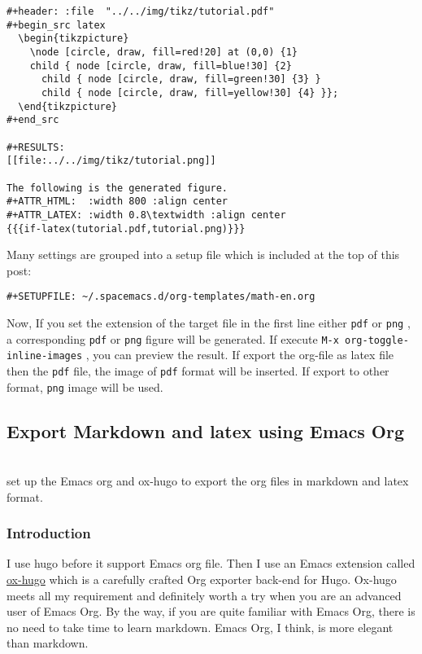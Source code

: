 \begin{verbatim}
#+header: :file  "../../img/tikz/tutorial.pdf"
#+begin_src latex
  \begin{tikzpicture}
    \node [circle, draw, fill=red!20] at (0,0) {1}
    child { node [circle, draw, fill=blue!30] {2}
      child { node [circle, draw, fill=green!30] {3} }
      child { node [circle, draw, fill=yellow!30] {4} }};
  \end{tikzpicture}
#+end_src

#+RESULTS:
[[file:../../img/tikz/tutorial.png]]

The following is the generated figure.
#+ATTR_HTML:  :width 800 :align center
#+ATTR_LATEX: :width 0.8\textwidth :align center
{{{if-latex(tutorial.pdf,tutorial.png)}}}
\end{verbatim}

Many settings are grouped into a setup file which is included at the top of this
post:
\begin{verbatim}
#+SETUPFILE: ~/.spacemacs.d/org-templates/math-en.org
\end{verbatim}

Now, If you set the extension of the target file in the first line either \texttt{pdf} or
\texttt{png} , a corresponding \texttt{pdf} or \texttt{png} figure will be generated. If execute \texttt{M-x
org-toggle-inline-images}  , you can preview the result. If export the org-file
as latex file then the \texttt{pdf} file, the image of \texttt{pdf} format will be inserted. If
export to other format, \texttt{png} image will be used.



\subsection{Export Markdown and latex using Emacs Org}
\label{sec:orgf87a4ad}


\hspace{0pt}\\


set up the Emacs org and ox-hugo to export the org files in markdown and latex format.


\subsubsection{Introduction}
\label{sec:orgb9aacc7}


I use hugo before it support Emacs org file. Then I use an Emacs extension
called \href{https://github.com/kaushalmodi/ox-hugo}{ox-hugo} which is a carefully crafted Org exporter back-end for Hugo.
Ox-hugo meets all my requirement and definitely worth a try when you are an
advanced user of Emacs Org. By the way, if you are quite familiar with Emacs
Org, there is no need to take time to learn markdown. Emacs Org, I think, is
more elegant than markdown.

